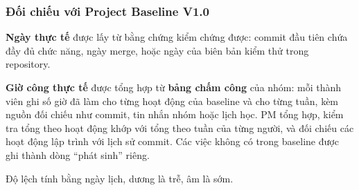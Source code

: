 \subsubsection{Đối chiếu với Project Baseline V1.0}
\label{sec:t3-actual}

\label{sec:t3-effort-method}

\textbf{Ngày thực tế} được lấy từ bằng chứng kiểm chứng được: commit đầu tiên chứa đầy đủ chức năng, ngày merge, hoặc ngày của biên bản kiểm thử trong repository.

\textbf{Giờ công thực tế} được tổng hợp từ \textbf{bảng chấm công} của nhóm: mỗi thành viên ghi số giờ đã làm cho từng hoạt động của baseline và cho từng tuần, kèm nguồn đối chiếu như commit, tin nhắn nhóm hoặc lịch học. PM tổng hợp, kiểm tra tổng theo hoạt động khớp với tổng theo tuần của từng người, và đối chiếu các hoạt động lập trình với lịch sử commit. Các việc không có trong baseline được ghi thành dòng ``phát sinh'' riêng.


Độ lệch tính bằng ngày lịch, dương là trễ, âm là sớm.

